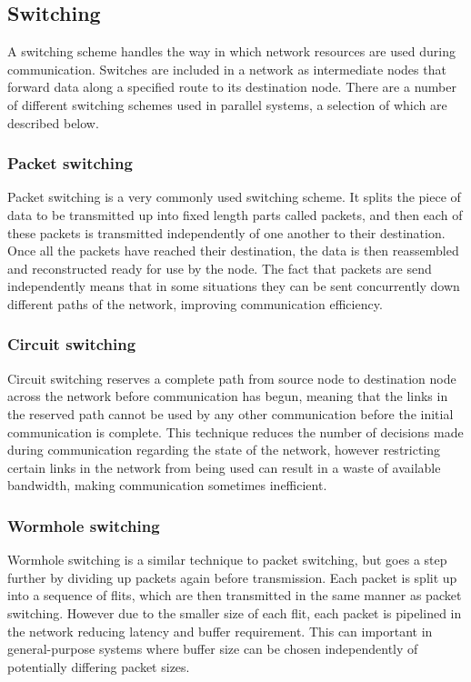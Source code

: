 \documentclass[a4paper, 12pt]{article}
\begin{document}
\subsection{Switching}

A switching scheme handles the way in which network resources are used during communication. Switches are included in a network as intermediate nodes that forward data along a specified route to its destination node. There are a number of different switching schemes used in parallel systems, a selection of which are described below.

\subsubsection{Packet switching}

Packet switching is a very commonly used switching scheme. It splits the piece of data to be transmitted up into fixed length parts called packets, and then each of these packets is transmitted independently of one another to their destination. Once all the packets have reached their destination, the data is then reassembled and reconstructed ready for use by the node. The fact that packets are send independently means that in some situations they can be sent concurrently down different paths of the network, improving communication efficiency.

\subsubsection{Circuit switching}

Circuit switching reserves a complete path from source node to destination node across the network before communication has begun, meaning that the links in the reserved path cannot be used by any other communication before the initial communication is complete. This technique reduces the number of decisions made during communication regarding the state of the network, however restricting certain links in the network from being used can result in a waste of available bandwidth, making communication sometimes inefficient.

\subsubsection{Wormhole switching}

Wormhole switching is a similar technique to packet switching, but goes a step further by dividing up packets again before transmission. Each packet is split up into a sequence of flits, which are then transmitted in the same manner as packet switching. However due to the smaller size of each flit, each packet is pipelined in the network reducing latency and buffer requirement. This can important in general-purpose systems where buffer size can be chosen independently of potentially differing packet sizes.
\end{document}
